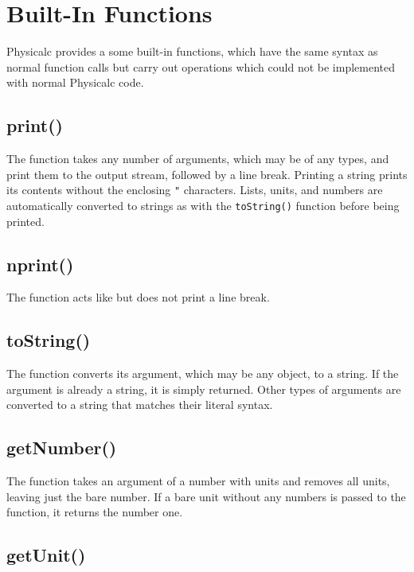 \section{Built-In Functions}
\label{builtins}

Physicalc provides a some built-in functions, which have the same
syntax as normal function calls but carry out operations which could
not be implemented with normal Physicalc code.

\subsection{print()}

The  function takes any number of arguments, which may be
of any types, and print them to the output stream, followed by a line
break.  Printing a string prints its contents without the enclosing
\verb|"| characters.  Lists, units, and numbers are automatically
converted to strings as with the \verb|toString()| function before being
printed.

\subsection{nprint()}

The  function acts like  but does not print
a line break.

\subsection{toString()}

The  function converts its argument, which may be any
object, to a string.  If the argument is already a string, it is
simply returned.  Other types of arguments are converted to a string
that matches their literal syntax.

\subsection{getNumber()}

The  function takes an argument of a number with
units and removes all units, leaving just the bare number.  If a bare
unit without any numbers is passed to the function, it returns the
number one.

\subsection{getUnit()}

